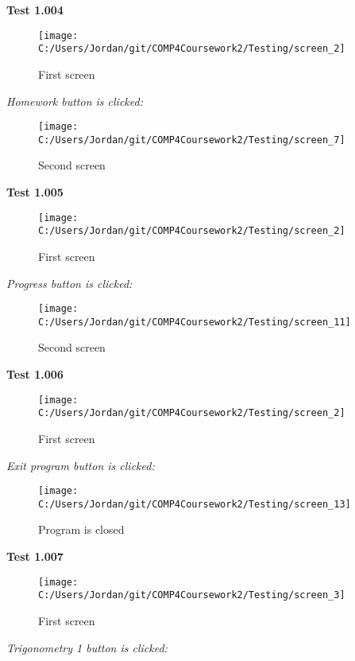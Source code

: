 \textbf{Test 1.004}

\begin{figure}[H]
    \label{fig: First Screen}\caption{First screen}
    \texttt{[image: C:/Users/Jordan/git/COMP4Coursework2/Testing/screen\_2]}
\end{figure}

\textit{Homework button is clicked: }

\begin{figure}[H]
    \label{fig: Second Screen}\caption{Second screen}
    \texttt{[image: C:/Users/Jordan/git/COMP4Coursework2/Testing/screen\_7]}
\end{figure}

\textbf{Test 1.005}

\begin{figure}[H]
    \label{fig: First Screen}\caption{First screen}
    \texttt{[image: C:/Users/Jordan/git/COMP4Coursework2/Testing/screen\_2]}
\end{figure}

\textit{Progress button is clicked: }

\begin{figure}[H]
    \label{fig: Second Screen}\caption{Second screen}
    \texttt{[image: C:/Users/Jordan/git/COMP4Coursework2/Testing/screen\_11]}
\end{figure}

\textbf{Test 1.006}

\begin{figure}[H]
    \label{fig: First Screen}\caption{First screen}
    \texttt{[image: C:/Users/Jordan/git/COMP4Coursework2/Testing/screen\_2]}
\end{figure}

\textit{Exit program button is clicked: }

\begin{figure}[H]
    \label{fig: Second Screen}\caption{Program is closed}
    \texttt{[image: C:/Users/Jordan/git/COMP4Coursework2/Testing/screen\_13]}
\end{figure}

\textbf{Test 1.007}

\begin{figure}[H]
    \label{fig: First Screen}\caption{First screen}
    \texttt{[image: C:/Users/Jordan/git/COMP4Coursework2/Testing/screen\_3]}
\end{figure}

\textit{Trigonometry 1 button is clicked: }

